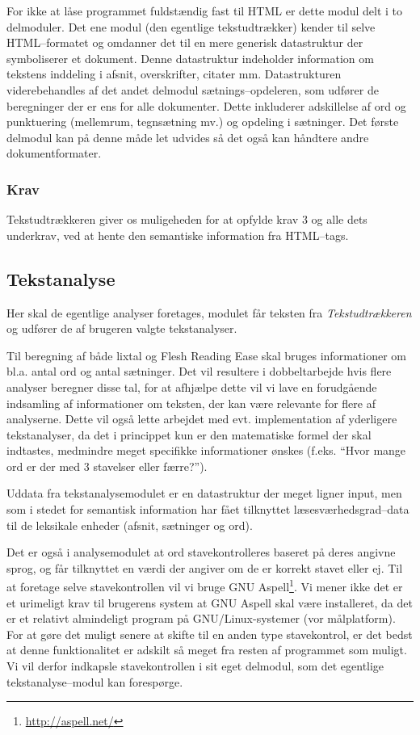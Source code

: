 \documentclass[a4paper,oneside]{memoir}
\begin{document}
For ikke at låse programmet fuldstændig fast til HTML er dette modul
delt i to delmoduler. Det ene modul (den egentlige tekstudtrækker)
kender til selve HTML--formatet og omdanner det til en mere generisk
datastruktur der symboliserer et dokument. Denne datastruktur
indeholder information om tekstens inddeling i afsnit, overskrifter,
citater mm. Datastrukturen viderebehandles af det andet delmodul
sætnings--opdeleren, som udfører de
beregninger der er ens for
alle dokumenter. Dette inkluderer adskillelse af ord og punktuering
(mellemrum, tegnsætning mv.) og opdeling i sætninger.  Det første
delmodul kan på denne måde let udvides så det også kan håndtere andre
dokumentformater.

\subsubsection*{Krav}
Tekstudtrækkeren giver os muligeheden for at opfylde krav 3 og alle
dets underkrav, ved at hente den semantiske information fra
HTML--tags.

\subsection{Tekstanalyse}
\label{tekstanalysedesign}
Her skal de egentlige analyser foretages, modulet får teksten fra
\textit{Tekstudtrækkeren} og udfører de af brugeren valgte
tekstanalyser.

Til beregning af både lixtal og Flesh Reading Ease skal bruges
informationer om bl.a. antal ord og antal sætninger. Det vil resultere
i dobbeltarbejde hvis flere analyser beregner disse tal, for at
afhjælpe dette vil vi lave en forudgående indsamling af informationer
om teksten, der kan være relevante for flere af analyserne. Dette vil
også lette arbejdet med evt. implementation af yderligere
tekstanalyser, da det i princippet kun er den matematiske formel der
skal indtastes, medmindre meget specifikke informationer ønskes
(f.eks. ``Hvor mange ord er der med 3 stavelser eller færre?'').

Uddata fra tekstanalysemodulet er en datastruktur der meget ligner
input, men som i stedet for semantisk information har fået tilknyttet
læsesværhedsgrad--data til de leksikale enheder (afsnit, sætninger og
ord).

Det er også i analysemodulet at ord stavekontrolleres baseret på deres
angivne sprog, og får tilknyttet en værdi der angiver om de er korrekt
stavet eller ej. Til at foretage selve stavekontrollen vil vi bruge
GNU Aspell\footnote{\url{http://aspell.net/}}. Vi mener ikke det er et
urimeligt krav til brugerens system at GNU Aspell skal være
installeret, da det er et relativt almindeligt program på
GNU/Linux-systemer (vor målplatform). For at gøre det muligt senere at
skifte til en anden type stavekontrol, er det bedst at denne
funktionalitet er adskilt så meget fra resten af programmet som
muligt. Vi vil derfor indkapsle stavekontrollen i sit eget delmodul,
som det egentlige tekstanalyse--modul kan forespørge.
\end{document}
